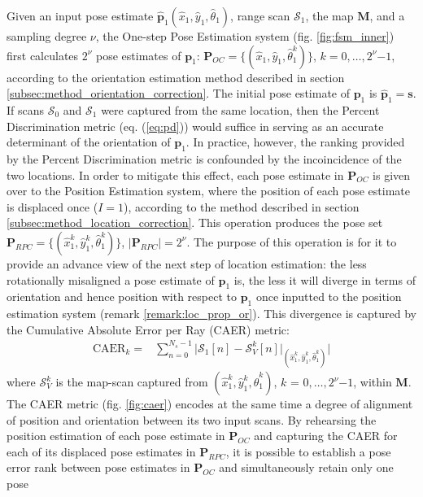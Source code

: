 Given an input pose estimate $\hat{\bm{p}}_1(\hat{x}_1, \hat{y}_1,
\hat{\theta}_1)$, range scan $\mathcal{S}_1$, the map $\bm{M}$, and a sampling
degree $\nu$, the One-step Pose Estimation system (fig. \ref{fig:fsm_inner})
first calculates $2^\nu$ pose estimates of $\bm{p}_1$: $\bm{P}_{OC} =
\{(\hat{x}_1, \hat{y}_1, \hat{\theta}_1^k)\}$, $k = 0,\dots,2^\nu$$-$$1$,
according to the orientation estimation method described in section
\ref{subsec:method_orientation_correction}. The initial pose estimate of
$\bm{p}_1$ is $\hat{\bm{p}}_1 = \bm{s}$.
If scans $\mathcal{S}_0$ and $\mathcal{S}_1$ were captured from the same
location, then the Percent Discrimination metric (eq. (\ref{eq:pd})) would
suffice in serving as an accurate determinant of the orientation of $\bm{p}_1$.
In practice, however, the ranking provided by the Percent Discrimination metric
is confounded by the incoincidence of the two locations. In order to mitigate
this effect, each pose estimate in $\bm{P}_{OC}$ is given over to the Position
Estimation system, where the position of each pose estimate is displaced once
($I=1$), according to the method described in section
\ref{subsec:method_location_correction}.  This operation produces the pose set
$\bm{P}_{RPC} = \{(\hat{x}_1^k, \hat{y}_1^k, \hat{\theta}_1^k)\}$,
$|\bm{P}_{RPC}| = 2^\nu$. The purpose of this operation is for it to provide an
advance view of the next step of location estimation: the less rotationally
misaligned a pose estimate of $\bm{p}_1$ is, the less it will diverge in terms
of orientation and hence position with respect to $\bm{p}_1$ once inputted to
the position estimation system (remark \ref{remark:loc_prop_or}). This
divergence is captured by the Cumulative Absolute Error per Ray (CAER) metric:
\begin{align}
  \text{CAER}_k = & \sum\limits_{n=0}^{N_s-1} \Bigg| \mathcal{S}_1[n] - \mathcal{S}_V^k[n]\Big|_{(\hat{x}_1^k, \hat{y}_1^k, \hat{\theta}_1^k)} \Bigg|
  \label{eq:caer}
\end{align}
where $\mathcal{S}_V^k$ is the map-scan captured from
$(\hat{x}_1^k, \hat{y}_1^k, \hat{\theta}_1^k)$, $k$ = $0,\dots,2^\nu$$-$$1$,
within $\bm{M}$. The CAER metric (fig. \ref{fig:caer})
encodes at the same time a degree of alignment of position and orientation
between its two input scans. By rehearsing the position estimation of each pose
estimate in $\bm{P}_{OC}$ and capturing the CAER for each of its displaced pose
estimates in $\bm{P}_{RPC}$, it is possible to establish a pose error rank
between pose estimates in $\bm{P}_{OC}$ and simultaneously retain only one pose
